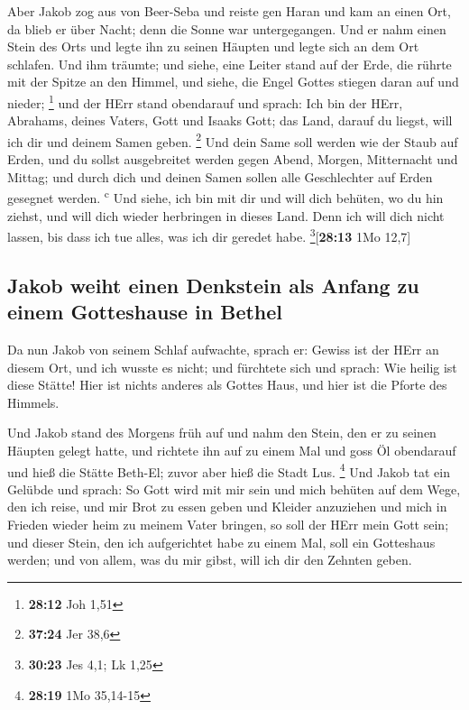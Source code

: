  Aber Jakob zog aus von Beer-Seba und reiste gen Haran
 und kam an einen Ort, da blieb er über Nacht; denn die
Sonne war untergegangen. Und er nahm einen Stein des Orts und legte ihn
zu seinen Häupten und legte sich an dem Ort schlafen. 
Und ihm träumte; und siehe, eine Leiter stand auf der Erde, die rührte
mit der Spitze an den Himmel, und siehe, die Engel Gottes stiegen daran
auf und nieder; \footnote{\textbf{28:12} Joh 1,51}  und
der HErr stand obendarauf und sprach: Ich bin der HErr, Abrahams, deines
Vaters, Gott und Isaaks Gott; das Land, darauf du liegst, will ich dir
und deinem Samen geben. \footnote{\textbf{37:24} Jer 38,6}
 Und dein Same soll werden wie der Staub auf Erden, und
du sollst ausgebreitet werden gegen Abend, Morgen, Mitternacht und
Mittag; und durch dich und deinen Samen sollen alle Geschlechter auf
Erden gesegnet werden. \textsuperscript{c}  Und siehe,
ich bin mit dir und will dich behüten, wo du hin ziehst, und will dich
wieder herbringen in dieses Land. Denn ich will dich nicht lassen, bis
dass ich tue alles, was ich dir geredet habe.
\footnote{\textbf{30:23} Jes 4,1; Lk 1,25}{[}\textbf{28:13} 1Mo 12,7{]}

\hypertarget{jakob-weiht-einen-denkstein-als-anfang-zu-einem-gotteshause-in-bethel}{%
\subsection{Jakob weiht einen Denkstein als Anfang zu einem Gotteshause
in
Bethel}\label{jakob-weiht-einen-denkstein-als-anfang-zu-einem-gotteshause-in-bethel}}

 Da nun Jakob von seinem Schlaf aufwachte, sprach er:
Gewiss ist der HErr an diesem Ort, und ich wusste es nicht;
 und fürchtete sich und sprach: Wie heilig ist diese
Stätte! Hier ist nichts anderes als Gottes Haus, und hier ist die Pforte
des Himmels.

 Und Jakob stand des Morgens früh auf und nahm den Stein,
den er zu seinen Häupten gelegt hatte, und richtete ihn auf zu einem Mal
und goss Öl obendarauf  und hieß die Stätte Beth-El;
zuvor aber hieß die Stadt Lus. \footnote{\textbf{28:19} 1Mo 35,14-15}
 Und Jakob tat ein Gelübde und sprach: So Gott wird mit
mir sein und mich behüten auf dem Wege, den ich reise, und mir Brot zu
essen geben und Kleider anzuziehen  und mich in Frieden
wieder heim zu meinem Vater bringen, so soll der HErr mein Gott sein;
 und dieser Stein, den ich aufgerichtet habe zu einem
Mal, soll ein Gotteshaus werden; und von allem, was du mir gibst, will
ich dir den Zehnten geben.

